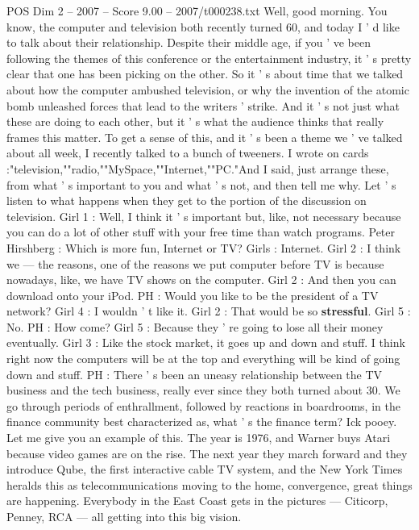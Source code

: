 \begin{textsample}{POS Dim 2 – 2007 – Score 9.00 – 2007/t000238.txt}  \label{ex:f2_pos_088}
Well, good morning.
You know, the computer and television both recently turned 60, and today I ' d like to talk about their relationship.
Despite their middle age, if you ' ve been following the themes of this conference or the entertainment industry, it ' s pretty clear that one has been picking on the other.
So it ' s about time that we talked about how the computer ambushed television, or why the invention of the atomic bomb unleashed forces that lead to the writers ' strike.
And it ' s not just what these are doing to each other, but it ' s what the audience thinks that really frames this matter.
To get a sense of this, and it ' s been a theme we ' ve talked about all week, I recently talked to a bunch of tweeners.
I wrote on cards :"television,""radio,""MySpace,""Internet,""PC."And I said, just arrange these, from what ' s important to you and what ' s not, and then tell me why.
Let ' s listen to what happens when they get to the portion of the discussion on television.
Girl 1 : Well, I think it ' s important but, like, not necessary because you can do a lot of other stuff with your free time than watch programs.
Peter Hirshberg : Which is more fun, Internet or TV?
Girls : Internet.
Girl 2 : I think we — the reasons, one of the reasons we put computer before TV is because nowadays, like, we have TV shows on the computer.
Girl 2 : And then you can download onto your iPod.
PH : Would you like to be the president of a TV network?
Girl 4 : I wouldn ' t like it.
Girl 2 : That would be so \textbf{stressful}.
Girl 5 : No.
PH : How come?
Girl 5 : Because they ' re going to lose all their money eventually.
Girl 3 : Like the stock market, it goes up and down and stuff.
I think right now the computers will be at the top and everything will be kind of going down and stuff.
PH : There ' s been an uneasy relationship between the TV business and the tech business, really ever since they both turned about 30.
We go through periods of enthrallment, followed by reactions in boardrooms, in the finance community best characterized as, what ' s the finance term?
Ick pooey.
Let me give you an example of this.
The year is 1976, and Warner buys Atari because video games are on the rise.
The next year they march forward and they introduce Qube, the first interactive cable TV system, and the New York Times heralds this as telecommunications moving to the home, convergence, great things are happening.
Everybody in the East Coast gets in the pictures — Citicorp, Penney, RCA — all getting into this big vision.

\end{textsample}

